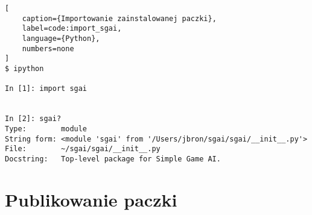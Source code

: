 \begin{onepage}
    \begin{lstlisting}[
    caption={Importowanie zainstalowanej paczki},
    label=code:import_sgai,
    language={Python},
    numbers=none
]
$ ipython

In [1]: import sgai


In [2]: sgai?
Type:        module
String form: <module 'sgai' from '/Users/jbron/sgai/sgai/__init__.py'>
File:        ~/sgai/sgai/__init__.py
Docstring:   Top-level package for Simple Game AI.

\end{lstlisting}
\end{onepage}






\section{Publikowanie paczki}

